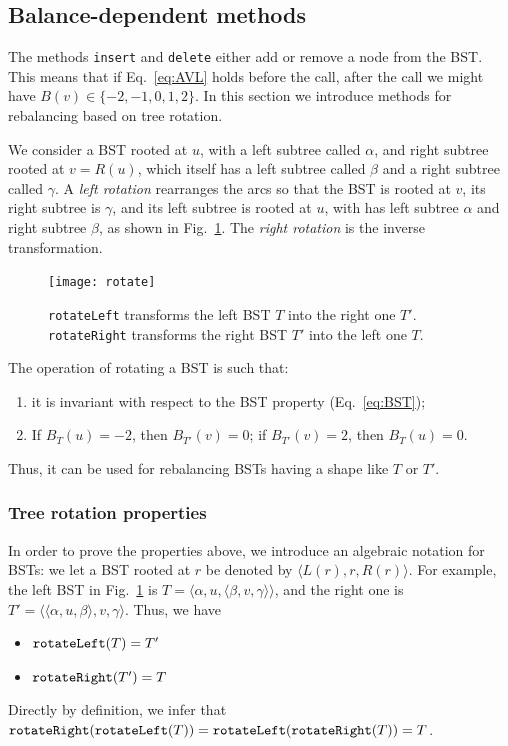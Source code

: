 \documentclass[a4paper]{book}
\theoremstyle{changebreak}                %
\begin{document}
\subsection{Balance-dependent methods}
The methods {\tt insert} and {\tt delete}
either add or remove a node from the BST. This means that if
Eq.~\eqref{eq:AVL} holds before the call, after the call we might have
$B(v)\in\{-2,-1,0,1,2\}$. In this section we introduce methods for
rebalancing based on tree rotation.

We consider a BST rooted at $u$, with a left subtree called $\alpha$,
and right subtree rooted at $v=R(u)$, which itself has a left subtree
called $\beta$ and a right subtree called $\gamma$. A {\it left
  rotation} rearranges the arcs so that the BST
is rooted at $v$, its right subtree is $\gamma$, and its left subtree
is rooted at $u$, with has left subtree $\alpha$ and right subtree
$\beta$, as shown in Fig.~\ref{f:rotate}. The {\it right
  rotation} is the inverse
transformation.
\begin{figure}[!ht]
\begin{center}
\texttt{[image: rotate]}
\end{center}
\caption{{\tt rotateLeft} transforms the left BST $T$
  into the right one $T'$. {\tt rotateRight} transforms the right
  BST $T'$ into the left one $T$.}
\label{f:rotate}
\end{figure}
The operation of rotating a BST is such that:
\begin{enumerate}
\item it is invariant with respect to the BST
  property (Eq.~\eqref{eq:BST});
\item If $B_T(u)=-2$, then $B_{T'}(v)=0$; if $B_{T'}(v)=2$, then
  $B_{T}(u)=0$.
\end{enumerate}
Thus, it can be used for rebalancing BSTs
having a shape like $T$ or $T'$.

\subsubsection{Tree rotation properties}
In order to prove the properties above, we introduce an algebraic
notation for BSTs: we let a BST rooted at $r$ be
denoted by $\langle L(r),r,R(r)\rangle$. For example, the left BST in
Fig.~\ref{f:rotate} is
$T=\langle\alpha,u,\langle\beta,v,\gamma\rangle\rangle$, and the right
one is $T'=\langle\langle\alpha,u,\beta\rangle,v,\gamma\rangle$. Thus,
we have
\begin{itemize}
\item $\mbox{\tt rotateLeft}(T)=T'$ 
\item $\mbox{\tt rotateRight}(T')=T$
\end{itemize}
Directly by definition, we infer that $\mbox{\tt
  rotateRight}(\mbox{\tt rotateLeft}(T))=\mbox{\tt
  rotateLeft}(\mbox{\tt rotateRight}(T))=T$.
\end{document}

